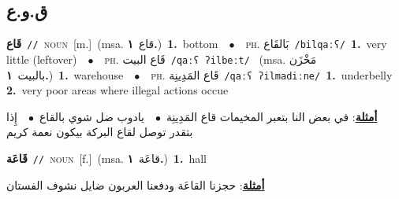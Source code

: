 \documentclass[10pt,a4paper,twoside]{article} %
\begin{document}
\begin{multicols}{2}
\vspace{-3mm}
\subsection*{\color{blue}\foreignlanguage{arabic}{ق.و.ع}\color{blue}{}} 

{\setlength\topsep{0pt}\textbf{\foreignlanguage{arabic}{قَاع}}\ {\color{gray}\texttt{//}\color{black}}\ \textsc{noun}\ [m.]\ \color{gray}(msa. \foreignlanguage{arabic}{قاع}~\foreignlanguage{arabic}{\textbf{١.}})\color{black}\ \textbf{1.}~bottom\ \ $\bullet$\ \ \textsc{ph.} \color{gray} \foreignlanguage{arabic}{بَالقَاع}\color{black}\ {\color{gray}\texttt{/{\sffamily bilqaːʕ}/}\color{black}}\ \textbf{1.}~very little (leftover)\ \ $\bullet$\ \ \textsc{ph.} \color{gray} \foreignlanguage{arabic}{قَاع البيت}\color{black}\ {\color{gray}\texttt{/{\sffamily qaːʕ ʔilbeːt}/}\color{black}}\ \color{gray} (msa. \foreignlanguage{arabic}{مَخْزَن بالبيت}~\foreignlanguage{arabic}{\textbf{١.}})\color{black}\ \textbf{1.}~warehouse\ \ $\bullet$\ \ \textsc{ph.} \color{gray} \foreignlanguage{arabic}{قَاع المَدِينِة}\color{black}\ {\color{gray}\texttt{/{\sffamily qaːʕ ʔilmadiːne}/}\color{black}}\ \textbf{1.}~underbelly  \textbf{2.}~very poor areas where illegal actions occue\  \begin{flushright}\color{gray}\foreignlanguage{arabic}{\textbf{\underline{\foreignlanguage{arabic}{أمثلة}}}: في بعض النا بتعبر المخيمات قاع المَدِينِة\ $\bullet$\ \  يادوب ضل شوي بالقاع\ $\bullet$\ \  إِذا بتقدر توصل لقاع البركة بيكون نعمة كريم}\end{flushright}\color{black}} \vspace{2mm}

{\setlength\topsep{0pt}\textbf{\foreignlanguage{arabic}{قَاعَة}}\ {\color{gray}\texttt{//}\color{black}}\ \textsc{noun}\ [f.]\ \color{gray}(msa. \foreignlanguage{arabic}{قاعَة}~\foreignlanguage{arabic}{\textbf{١.}})\color{black}\ \textbf{1.}~hall\  \begin{flushright}\color{gray}\foreignlanguage{arabic}{\textbf{\underline{\foreignlanguage{arabic}{أمثلة}}}: حجزنا القاعَة ودفعنا العربون ضايل نشوف الفستان}\end{flushright}\color{black}} \vspace{2mm}


\end{multicols}
\end{document}
